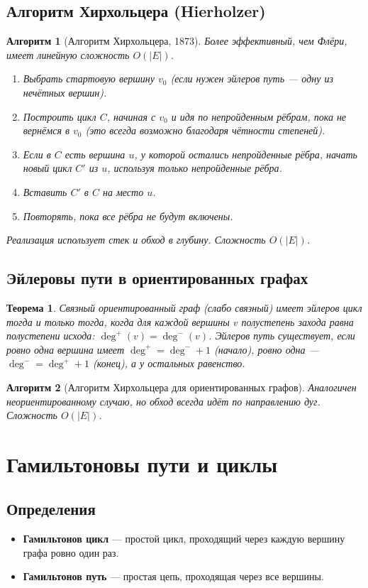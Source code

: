 \documentclass[12pt]{article}
\newtheorem{theorem}{Теорема}
\newtheorem{algorithm}{Алгоритм}
\begin{document}
\begin{enumerate}
\subsection{Алгоритм Хирхольцера (Hierholzer)}
\begin{algorithm}[Алгоритм Хирхольцера, 1873]
    Более эффективный, чем Флёри, имеет линейную сложность \(O(|E|)\).
    \begin{enumerate}
        \item Выбрать стартовую вершину \(v_0\) (если нужен эйлеров путь — одну из нечётных вершин).
        \item Построить цикл \(C\), начиная с \(v_0\) и идя по непройденным рёбрам, пока не вернёмся в \(v_0\) (это всегда возможно благодаря чётности степеней).
        \item Если в \(C\) есть вершина \(u\), у которой остались непройденные рёбра, начать новый цикл \(C'\) из \(u\), используя только непройденные рёбра.
        \item Вставить \(C'\) в \(C\) на место \(u\).
        \item Повторять, пока все рёбра не будут включены.
    \end{enumerate}
    Реализация использует стек и обход в глубину. Сложность \(O(|E|)\).
\end{algorithm}

\subsection{Эйлеровы пути в ориентированных графах}
\begin{theorem}
    Связный ориентированный граф (слабо связный) имеет эйлеров цикл тогда и только тогда, когда для каждой вершины \(v\) полустепень захода равна полустепени исхода: \(\deg^+(v) = \deg^-(v)\). Эйлеров путь существует, если ровно одна вершина имеет \(\deg^+ = \deg^- + 1\) (начало), ровно одна — \(\deg^- = \deg^+ + 1\) (конец), а у остальных равенство.
\end{theorem}
\begin{algorithm}[Алгоритм Хирхольцера для ориентированных графов]
    Аналогичен неориентированному случаю, но обход всегда идёт по направлению дуг. Сложность \(O(|E|)\).
\end{algorithm}

\section{Гамильтоновы пути и циклы}
\subsection{Определения}
\begin{itemize}
    \item \textbf{Гамильтонов цикл} — простой цикл, проходящий через каждую вершину графа ровно один раз.
    \item \textbf{Гамильтонов путь} — простая цепь, проходящая через все вершины.
\end{itemize}


\end{enumerate}
\end{document}
